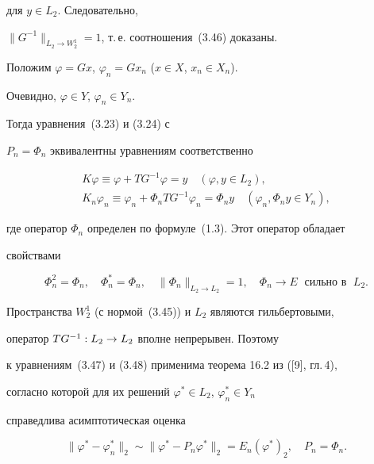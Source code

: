 для $y\in L_2$. Следовательно,


$\|G^{-1}\|_{{L_2\rightarrow W_2^1}} =1$, т.\,е. соотношения~(3.46) доказаны.





Положим $\varphi =Gx$, $\varphi_n =Gx_n$ ($x\in X$, $x_n\in X_n$).


Очевидно, $\varphi\in Y$, $\varphi_n\in Y_n$.


Тогда уравнения~(3.23) и (3.24) с


$P_n=\Phi_n$ эквивалентны уравнениям соответственно


\begin{gather}


K\varphi\equiv\varphi +TG^{-1}\varphi =y\quad (\varphi ,y\in L_2), \\


%


K_n\varphi_n\equiv\varphi_n +\Phi_nTG^{-1}\varphi_n =\Phi_ny


\quad (\varphi_n ,\Phi_ny\in Y_n),


\end{gather}


где оператор $\Phi_n$ определен по формуле~(1.3). Этот оператор обладает


свойствами


$$


\Phi_n^2=\Phi_n,\quad \Phi_n^*=\Phi_n,\quad


\|\Phi_n\|_{{L_2\rightarrow L_2}} =1,


\quad \Phi_n\rightarrow E\; \text{ сильно в }\; L_2.


$$


Пространства $W_2^1$ (с нормой~(3.45)) и $L_2$ являются гильбертовыми,


оператор $TG^{-1} : L_2 \to L_2$ вполне непрерывен. Поэтому


к уравнениям~(3.47) и (3.48) применима теорема 16.2 из ([9], гл.\,4),


согласно которой для их решений $\varphi^*\in L_2$, $\varphi_n^*\in Y_n$


справедлива асимптотическая оценка


\begin{equation}


\|\varphi^*-\varphi_n^*\|_2 \sim \|\varphi^*-P_n\varphi^*\|_2 =


E_n(\varphi^*)_2,\quad P_n=\Phi_n .


\end{equation}






